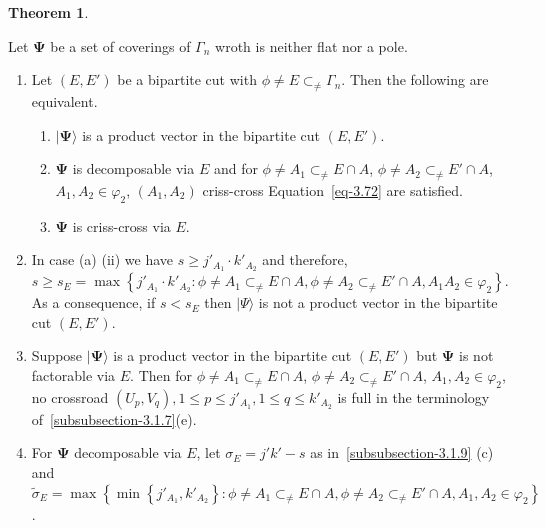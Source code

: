 \documentclass[a4paper,12pt]{article}
\theoremstyle{definition}
\theoremstyle{underlinethm}
\newtheorem{thm}{Theorem}[section]
\theoremstyle{definition}
\begin{document}
\begin{thm}\label{thm-3.9}

Let $\boldsymbol{\Psi}$ be a set of coverings of $\Gamma_{n}$ wroth is neither flat nor a pole.

\end{thm}

\begin{enumerate}[label=(\alph*)]
\item Let $(E, E')$ be a bipartite cut with $\phi \neq E \subset_{\neq} \Gamma_{n}$. Then the following are equivalent.
 \begin{enumerate}[label=(\roman*)]
\item $| \boldsymbol{\Psi} \rangle$ is a product vector in the bipartite cut $(E, E')$.

\item $\boldsymbol{\Psi}$ is decomposable via $E$ and for $\phi \neq A_{1} \subset_{\neq} E \cap A$, $\phi \neq A_{2} \subset_{\neq}  E' \cap A$, $A_{1}, A_{2} \in \varphi_{2}$, $(A_{1}, A_{2})$ criss-cross Equation~\eqref{eq-3.72} are satisfied.

\item $\boldsymbol{\Psi}$ is criss-cross via $E$.
 \end{enumerate}

\item In case (a) (ii) we have $s \geq j'_{A_{1}} \cdot k'_{A_{2}}$ and therefore,\\ $s \geq s_{E} = \max\left\{j'_{A_{1}} \cdot k'_{A_{2}} : \phi \neq A_{1} \subset_{\neq} E \cap A, \phi\neq A_{2} \subset_{\neq} E' \cap A, A_{1} A_{2} \in \varphi_{2} \right\}$. As a consequence, if $s < s_{E}$ then $| \Psi \rangle$ is not a product vector in the bipartite cut $(E, E')$. 

\item Suppose $| \boldsymbol{\Psi} \rangle$ is a product vector in the bipartite cut $(E, E')$ but $\boldsymbol{\Psi}$ is not factorable via $E$. Then for $\phi \neq A_{1} \subset_{\neq} E \cap A$, $\phi \neq A_{2} \subset_{\neq} E' \cap A$, $A_{1}, A_{2} \in \varphi_{2}$, no crossroad $\left(U_{p}, V_{q}\right), 1 \leq p \leq j'_{A_{1}}, 1 \leq q \leq k'_{A_{2}}$ is full in the terminology of~\eqref{subsubsection-3.1.7}(e).

\item For $\boldsymbol{\Psi}$ decomposable via $E$, let $\sigma_{E} = j'k'-s$ as in~\eqref{subsubsection-3.1.9} (c) and $\widetilde{\sigma}_{E} = \max \left\{\min \left\{j'_{A_{1}}, k'_{A_{2}}\right\} : \phi \neq A_{1} \subset_{\neq} E \cap A, \phi \neq A_{2} \subset_{\neq} E' \cap A, A_{1}, A_{2} \in \varphi_{2} \right\}$.


\end{enumerate}
\end{document}
